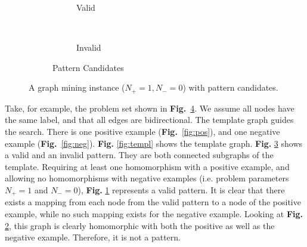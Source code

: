 \begin{figure}[h]
\begin{subfigure}[b]{0.45\textwidth}
{\begin{subfigure}[b]{0.45\textwidth}
        \caption{Valid\label{fig:correctcandidate}}
      \end{subfigure}
      ~
      \begin{subfigure}[b]{0.45\textwidth}
        \caption{Invalid\label{fig:incorrectcandidate}}
      \end{subfigure}
    }
    \setcounter{subfigure}{3}
    \caption{Pattern Candidates\label{fig:candidates}}
  \end{subfigure}
  \caption{A graph mining instance ($N_{+}=1, N_{-}=0$) with pattern candidates.\label{fig:ex1}}
\end{figure}


Take, for example, the problem set shown in \textbf{Fig.}~\ref{fig:ex1}. We assume all nodes have the same label, and that all edges are bidirectional.
The template graph guides the search.
There is one positive example (\textbf{Fig.}~\ref{fig:pos}), and one negative example (\textbf{Fig.}~\ref{fig:neg}). 
\textbf{Fig.} \ref{fig:templ} shows the template graph.
\textbf{Fig.} \ref{fig:candidates} shows a valid and an invalid pattern. 
They are both connected subgraphs of the template.
Requiring at least one homomorphism with a positive example, and allowing no homomorphisms with negative examples (i.e. problem parameters $N_{+}=1$ and $N_{-}=0$), \textbf{Fig.} \ref{fig:correctcandidate} represents a valid pattern.
It is clear that there exists a mapping from each node from the valid pattern to a node of the positive example, while no such mapping exists for the negative example.
Looking at \textbf{Fig.} \ref{fig:incorrectcandidate}, this graph is clearly homomorphic with both the positive as well as the negative example. Therefore, it is not a pattern.

